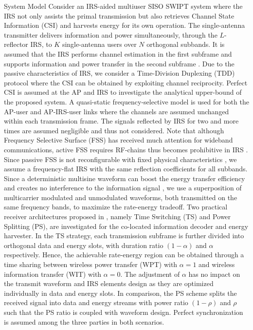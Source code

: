\documentclass{IEEEtran}
\begin{document}
\begin{section}{System Model}
	Consider an IRS-aided multiuser SISO SWIPT system where the IRS not only assists the primal transmission but also retrieves Channel State Information (CSI) and harvests energy for its own operation. The single-antenna transmitter delivers information and power simultaneously, through the $L$-reflector IRS, to $K$ single-antenna users over $N$ orthogonal subbands. It is assumed that the IRS performs channel estimation in the first subframe and supports information and power transfer in the second subframe \cite{Zheng2019}. Due to the passive characteristics of IRS, we consider a Time-Division Duplexing (TDD) protocol where the CSI can be obtained by exploiting channel reciprocity. Perfect CSI is assumed at the AP and IRS to investigate the analytical upper-bound of the proposed system. A quasi-static frequency-selective model is used for both the AP-user and AP-IRS-user links where the channels are assumed unchanged within each transmission frame. The signals reflected by IRS for two and more times are assumed negligible and thus not considered. Note that although Frequency Selective Surface (FSS) has received much attention for wideband communications, active FSS requires RF-chains thus becomes prohibitive in IRS \cite{Kim2006,Xu2014}. Since passive FSS is not reconfigurable with fixed physical characteristics \cite{Anwar2018}, we assume a frequency-flat IRS with the same reflection coefficients for all subbands. Since a deterministic multisine waveform can boost the energy transfer efficiency \cite{Clerckx2016a} and creates no interference to the information signal \cite{Clerckx2018b}, we use a superposition of multicarrier modulated and unmodulated waveforms, both transmitted on the same frequency bands, to maximize the rate-energy tradeoff. Two practical receiver architectures proposed in \cite{Zhang2013}, namely Time Switching (TS) and Power Splitting (PS), are investigated for the co-located information decoder and energy harvester. In the TS strategy, each transmission subframe is further divided into orthogonal data and energy slots, with duration ratio $(1-\alpha)$ and $\alpha$ respectively. Hence, the achievable rate-energy region can be obtained through a time sharing between wireless power transfer (WPT) with $\alpha=1$ and wireless information transfer (WIT) with $\alpha=0$. The adjustment of $\alpha$ has no impact on the transmit waveform and IRS elements design as they are optimized individually in data and energy slots. In comparison, the PS scheme splits the received signal into data and energy streams with power ratio $(1-\rho)$ and $\rho$ such that the PS ratio is coupled with waveform design. Perfect synchronization is assumed among the three parties in both scenarios.


\end{section}
\end{document}
